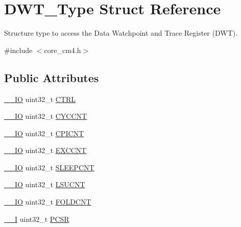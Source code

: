 \hypertarget{struct_d_w_t___type}{}\section{D\+W\+T\+\_\+\+Type Struct Reference}
\label{struct_d_w_t___type}


Structure type to access the Data Watchpoint and Trace Register (D\+WT).  




{\ttfamily \#include $<$core\+\_\+cm4.\+h$>$}

\subsection*{Public Attributes}
\begin{DoxyCompactItemize}
\item 
\hyperlink{core__cm4_8h_aec43007d9998a0a0e01faede4133d6be}{\+\_\+\+\_\+\+IO} uint32\+\_\+t \hyperlink{struct_d_w_t___type_a37964d64a58551b69ce4c8097210d37d}{C\+T\+RL}
\item 
\hyperlink{core__cm4_8h_aec43007d9998a0a0e01faede4133d6be}{\+\_\+\+\_\+\+IO} uint32\+\_\+t \hyperlink{struct_d_w_t___type_a71680298e85e96e57002f87e7ab78fd4}{C\+Y\+C\+C\+NT}
\item 
\hyperlink{core__cm4_8h_aec43007d9998a0a0e01faede4133d6be}{\+\_\+\+\_\+\+IO} uint32\+\_\+t \hyperlink{struct_d_w_t___type_a88cca2ab8eb1b5b507817656ceed89fc}{C\+P\+I\+C\+NT}
\item 
\hyperlink{core__cm4_8h_aec43007d9998a0a0e01faede4133d6be}{\+\_\+\+\_\+\+IO} uint32\+\_\+t \hyperlink{struct_d_w_t___type_ac0801a2328f3431e4706fed91c828f82}{E\+X\+C\+C\+NT}
\item 
\hyperlink{core__cm4_8h_aec43007d9998a0a0e01faede4133d6be}{\+\_\+\+\_\+\+IO} uint32\+\_\+t \hyperlink{struct_d_w_t___type_a8afd5a4bf994011748bc012fa442c74d}{S\+L\+E\+E\+P\+C\+NT}
\item 
\hyperlink{core__cm4_8h_aec43007d9998a0a0e01faede4133d6be}{\+\_\+\+\_\+\+IO} uint32\+\_\+t \hyperlink{struct_d_w_t___type_aeba92e6c7fd3de4ba06bfd94f47f5b35}{L\+S\+U\+C\+NT}
\item 
\hyperlink{core__cm4_8h_aec43007d9998a0a0e01faede4133d6be}{\+\_\+\+\_\+\+IO} uint32\+\_\+t \hyperlink{struct_d_w_t___type_a35f2315f870a574e3e6958face6584ab}{F\+O\+L\+D\+C\+NT}
\item 
\hyperlink{core__cm4_8h_af63697ed9952cc71e1225efe205f6cd3}{\+\_\+\+\_\+I} uint32\+\_\+t \hyperlink{struct_d_w_t___type_abc5ae11d98da0ad5531a5e979a3c2ab5}{P\+C\+SR}

\end{DoxyCompactItemize}
